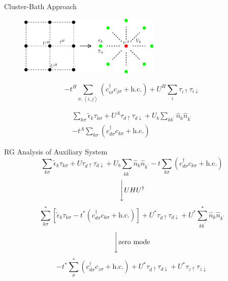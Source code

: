 \documentclass[aspectratio=169]{beamer}
\begin{document}
\begin{frame}{Cluster-Bath Approach}
	\begin{figure}[htpb]
		\centering
		\includegraphics[width=0.6\textwidth]{./cluster-bath.png}
	\end{figure}

\begin{minipage}{0.49\textwidth}
\begin{equation*}
-t^H\sum_{\sigma,\left<i,j \right>}\left(c^\dagger_{i\sigma} c_{j\sigma} + \text{h.c.}\right) + U^H\sum_i \tau_{i \uparrow} \tau_{i \downarrow}
\end{equation*}
\end{minipage}
\begin{minipage}{0.49\textwidth}
	\begin{equation*}\begin{aligned}
\sum_{k\sigma}\tilde\epsilon_k\tau_{k\sigma} + U^A \tau_{d \uparrow} \tau_{d \downarrow} + U_b \sum_{kk^\prime}\hat n_k \hat n_{k^\prime}\\
-t^A\sum_{k\sigma}\left(c^\dagger_{d\sigma}c_{k\sigma} + \text{h.c.}\right)
\end{aligned}\end{equation*}
\end{minipage}
\end{frame}
\begin{frame}{RG Analysis of Auxiliary System}
	\[\sum_{k\sigma}\tilde\epsilon_k\tau_{k\sigma} + U \tau_{d \uparrow} \tau_{d \downarrow} + U_b \sum_{kk^\prime}\hat n_k \hat n_{k^\prime} -t\sum_{k\sigma}\left(c^\dagger_{d\sigma}c_{k\sigma} + \text{h.c.}\right)\]
	\[\Bigg\downarrow U H U^\dagger\]
	\[\sum_{k\sigma}^*\left[\tilde\epsilon_k\tau_{k\sigma} -{t}^*\left(c^\dagger_{d\sigma}c_{k\sigma} + \text{h.c.}\right)\right] + U^* \tau_{d \uparrow} \tau_{d \downarrow} + U^* \sum_{kk^\prime}^*\hat n_k \hat n_{k^\prime} \]
	\[\Bigg\downarrow \text{zero mode}\]
	\[-{t}^*\sum_{\sigma}^*\left(c^\dagger_{d\sigma}c_{z\sigma} + \text{h.c.}\right) + U^* \tau_{d \uparrow} \tau_{d \downarrow} + U^* \tau_{z \uparrow} \tau_{z \downarrow} \]
\end{frame}
\end{document}
